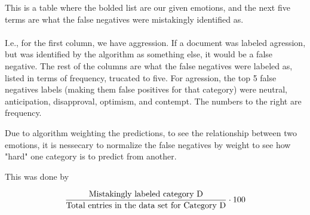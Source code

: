 \documentclass{article}
\begin{document}
This is a table where the bolded list are our given emotions, and the next five terms are what the false negatives were mistakingly identified as.
\\ \\
I.e., for the first column, we have aggression. If a document was labeled agression, but was identified by the algorithm as something else, it would be a false negative. The rest of the columns are what the false negatives were labeled as, listed in terms of frequency, trucated to five. For agression, the  top 5 false negatives labels (making them false positives for that category) were neutral, anticipation, disapproval, optimism, and contempt. The numbers to the right are frequency.

Due to algorithm weighting the predictions, to see the relationship between two emotions, it is nessecary to normalize the false negatives by weight to see how "hard" one category is to predict from another.

This was done by

$$ \frac{\textnormal{Mistakingly labeled category D} }{ \textnormal{Total entries in the data set for Category D}} \cdot 100$$
\end{document}
